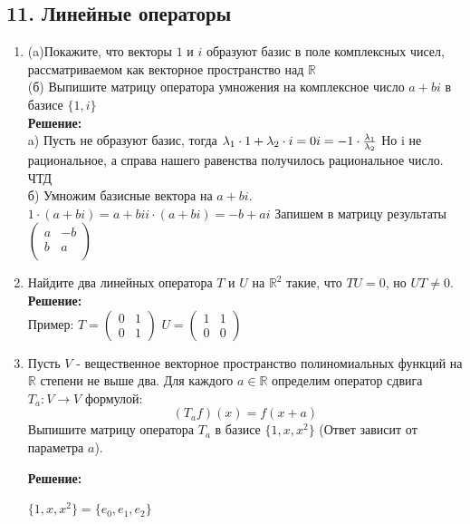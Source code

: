 \documentclass[]{book}
\theoremstyle{definition}
\newcommand{\bb}[1]{\mathbb{#1}}
\newcommand{\R}{\bb{R}}
\begin{document}
\subsection*{11. Линейные операторы}

\begin{enumerate}[resume]


\item (a)Покажите, что векторы $1$ и $i$ образуют базис в поле комплексных чисел, рассматриваемом как векторное пространство над $\bb{R}$\\
(б) Выпишите матрицу оператора умножения на комплексное число $a+bi$ в базисе $\{1, i\}$\\
\textbf{Решение:}\\
a) Пусть не образуют базис, тогда $\lambda_1\cdot 1 + \lambda_2\cdot i =0\\
i=-1\cdot \frac{\lambda_1}{\lambda_2}$
Но i не рациональное, а справа нашего равенства получилось рациональное число. ЧТД\\
б) Умножим базисные вектора на $a+bi$. $1\cdot (a+bi)=a+bi i\cdot (a+bi)= -b + ai$ Запишем в матрицу результаты $\begin{pmatrix} 
a & -b\\
b & a\\
\end{pmatrix}$

\item Найдите два линейных оператора $T$ и $U$ на $\bb{R}^2$ такие, что $TU = 0$, но $UT \neq 0$.
\\
\textbf{Решение:}\\
Пример:
$T = 
\begin{pmatrix} 
0 & 1 \\
0 & 1
\end{pmatrix}
$
$U= 
\begin{pmatrix} 
1 & 1 \\
0 & 0
\end{pmatrix}
$



\item Пусть $V$ - вещественное векторное пространство полиномиальных функций на $\R$ степени не выше два. Для каждого $a \in \R$ определим оператор сдвига $T_a \colon V \rightarrow V$ формулой:
$$(T_af)(x) = f(x+a)$$
Выпишите матрицу оператора $T_a$ в базисе $\{ 1,x, x^2\}$ (Ответ зависит от параметра $a$).

\textbf{Решение:}

$\{ 1,x, x^2\} = \{e_0, e_1, e_2\}$


\end{enumerate}
\end{document}
